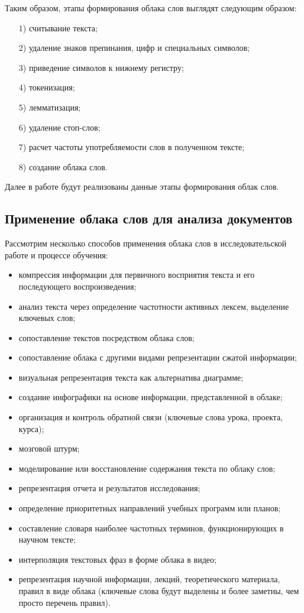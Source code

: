 \documentclass[bachelor, och, coursework ]{SCWorks}
\begin{document}
Таким образом, этапы формирования облака слов выглядят следующим образом: 
\begin{enumerate}
    \item[1)] считывание текста;
    \item[2)] удаление знаков препинания, цифр и специальных символов;		
    \item[3)] приведение символов к нижнему регистру;
    \item[4)] токенизация;
    \item[5)] лемматизация;
    \item[6)] удаление стоп-слов;
    \item[7)] расчет частоты употребляемости слов в полученном тексте;
    \item[8)] создание облака слов.
\end{enumerate}

Далее в работе будут реализованы данные этапы формирования облак слов.







\subsection{Применение облака слов для анализа документов}
Рассмотрим несколько способов применения облака слов в исследовательской работе и процессе обучения\cite{1}:
\begin{itemize} 
    \item компрессия информации для первичного восприятия текста и его последующего воспроизведения; 
    \item анализ текста через определение частотности активных лексем, выделение ключевых слов;
    \item сопоставление текстов посредством облака слов;
    \item сопоставление облака с другими видами репрезентации сжатой информации; 
    \item визуальная репрезентация текста как альтернатива диаграмме;
    \item создание инфографики на основе информации, представленной в облаке; 
    \item организация и контроль обратной связи (ключевые слова урока, проекта, курса); 
    \item мозговой штурм; 
    \item моделирование или восстановление содержания текста по облаку слов;
    \item репрезентация отчета и результатов исследования;
    \item определение приоритетных направлений учебных программ или планов;
    \item составление словаря наиболее частотных терминов, функционирующих в научном тексте; 
    \item интерполяция текстовых фраз в форме облака в видео; 
    \item репрезентация научной информации, лекций, теоретического материала, правил в виде облака (ключевые слова будут выделены и более заметны, чем просто перечень правил).
\end{itemize}
\end{document}
